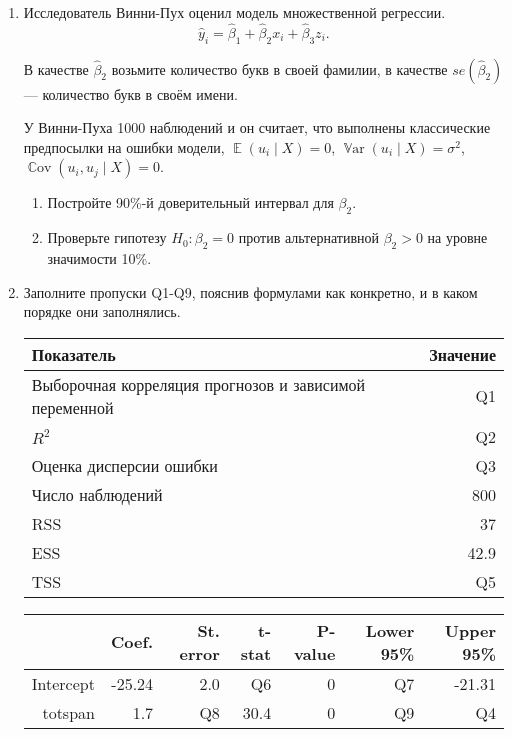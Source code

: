 \documentclass[12pt]{article}
\DeclareMathOperator{\Cov}{\mathbb{C}ov}
\DeclareMathOperator{\E}{\mathbb{E}}
\DeclareMathOperator{\Var}{\mathbb{V}ar}
\begin{document}
\newpage
\begin{enumerate}
    \item Исследователь Винни-Пух оценил модель множественной регрессии.
    \[
    \hat y_i = \hat\beta_1 + \hat\beta_2 x_i + \hat\beta_3 z_i.
    \]

    В качестве $\hat\beta_2$ возьмите количество букв в своей фамилии,
    в качестве $se(\hat\beta_2)$ — количество букв в своём имени. 

    У Винни-Пуха 1000 наблюдений и он считает, что выполнены классические предпосылки 
    на ошибки модели, $\E(u_i \mid X) = 0$, $\Var(u_i \mid X) = \sigma^2$, 
    $\Cov(u_i, u_j \mid X) = 0$.


    \begin{enumerate}
        \item Постройте 90\%-й доверительный интервал для $\beta_2$.
        \item Проверьте гипотезу $H_0: \beta_2 = 0$ против альтернативной 
        $\beta_2 >0$ на уровне значимости 10\%.
    \end{enumerate}

    \item Заполните пропуски Q1-Q9, пояснив формулами как конкретно, и в каком порядке они заполнялись.
    
    \begin{tabular}{lr} \toprule
    Показатель & Значение \\
    \midrule
    Выборочная корреляция прогнозов и зависимой переменной  & Q1 \\
    $R^2$     			& Q2 \\
    Оценка дисперсии ошибки 		& Q3 \\
    Число наблюдений		& 800 \\
    RSS & 37 \\
    ESS & 42.9 \\
    TSS & Q5 \\
    \bottomrule
    \end{tabular}


    \begin{tabular}{rrrrrrr}
    \toprule
                 & Coef. 	& St. error	& t-stat & P-value	& Lower 95\% 	& Upper 95\% \\
    \midrule
    Intercept 	& -25.24 	& 2.0 	& Q6 		& 0 	&  Q7		& -21.31 \\
    totspan		& 1.7		& Q8    & 30.4 	    & 0 	&  Q9	    & Q4 \\
    \bottomrule
    \end{tabular}
    

\end{enumerate}
\end{document}
